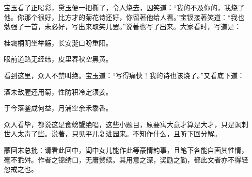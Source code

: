 \begin{parag}
    宝玉看了正喝彩，黛玉便一把撕了，令人烧去，因笑道：“我的不及你的，我烧了他。你那个很好，比方才的菊花诗还好，你留著他给人看。”宝钗接著笑道：“我也勉强了一首，未必好，写出来取笑儿罢。”说著也写了出来。大家看时，写道是：
\end{parag}


\begin{poem}
    \begin{pl}

        桂霭桐阴坐举觞，长安涎口盼重阳。
    \end{pl}
    \begin{pl}

        眼前道路无经纬，皮里春秋空黑黄。
    \end{pl}
\end{poem}

\begin{parag}
    看到这里，众人不禁叫绝。宝玉道：“写得痛快！我的诗也该烧了。”又看底下道：
\end{parag}


\begin{poem}
    \begin{pl}

        酒未敌腥还用菊，性防积冷定须姜。
    \end{pl}
    \begin{pl}

        于今落釜成何益，月浦空余禾黍香。
    \end{pl}
\end{poem}

\begin{parag}
    众人看毕，都说这是食螃蟹绝唱，这些小题目，原要寓大意才算是大才，只是讽刺世人太毒了些。说著，只见平儿复进园来。不知作什么，且听下回分解。
\end{parag}


\begin{parag}
    \begin{note}蒙回末总批：请看此回中，闺中女儿能作此等豪情韵事，且笔下各能自画其性情，毫不乖舛。作者之锦绣口，无庸赘续。其用意之深，奖励之勤，都此文者亦不得轻忽戒之也。\end{note}
\end{parag}
